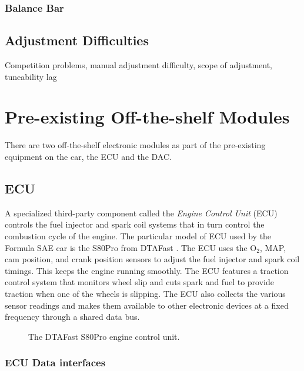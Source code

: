 \subsubsection{Balance Bar}


\subsection{Adjustment Difficulties}

Competition problems, manual adjustment difficulty, scope of adjustment,
tuneability lag

\section{Pre-existing Off-the-shelf Modules}

There are two off-the-shelf electronic modules as part of the pre-existing equipment on the car, the ECU and the DAC.

\subsection{ECU}

A specialized third-party component called the \emph{Engine Control Unit} (ECU) controls the fuel injector and spark coil systems that in turn control the combustion cycle of the engine. The particular model of ECU used by the Formula SAE car is the S80Pro from DTAFast \cite{s80pro}. The ECU uses the O$_{2}$, MAP, cam position, and crank position sensors to adjust the fuel injector and spark coil timings. This keeps the engine running smoothly. The ECU features a traction control system that monitors wheel slip and cuts spark and fuel to provide traction when one of the wheels is slipping. The ECU also collects the various sensor readings and makes them available to other electronic devices at a fixed frequency through a shared data bus. 

\begin{figure}[H]
\centering
\caption{The DTAFast S80Pro engine control unit.}
\label{fig:s80pro_product}
\end{figure}

\subsubsection{ECU Data interfaces\label{sec:background_ecu_data_interfaces}}

